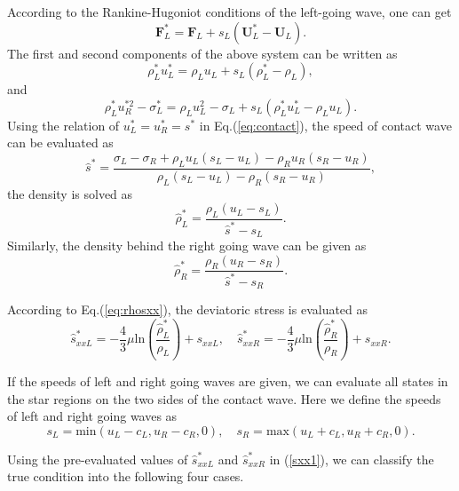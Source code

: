 \documentclass{article}
\numberwithin{equation}{section}
\numberwithin{table}{section}
\begin{document}
According to the Rankine-Hugoniot conditions of  the  left-going  wave, one can get
\begin{equation} \label{eq:RH1}
	\bm{F}_L^* = \bm{F}_L+s_L (\bm{U}_L^*-\bm{U}_L).
\end{equation}
The first and second components of the above system can be written as
\begin{equation} \label{eq:rhoLstar}
  \rho_L^* u_L^*=\rho_L u_L+s_L(\rho_L^*-\rho_L),
\end{equation}
and
\begin{equation}\label{eq:sigma}
  \rho_L^* u_R^{*2}-\sigma^*_L=\rho_L u_L^2-\sigma_L+s_L(\rho_L^* u_L^*-\rho_L u_L).
\end{equation}
Using the relation of $u_L^* =u_R^* = s^*$ in Eq.(\ref{eq:contact}), the speed of contact wave can be evaluated as
\begin{equation}
 \hat{s}^* = \frac{\sigma_L-\sigma_R+\rho_L u_L(s_L-u_L)-\rho_R u_R(s_R-u_R)}{\rho_L(s_L-u_L)-\rho_R(s_R-u_R)},
\end{equation}
the density is solved as
\begin{equation}\label{eq:rhoLs}
  \hat{\rho}_L^* = \frac{\rho_L(u_L-s_L)}{\hat{s}^*-s_L}.
\end{equation}
Similarly, the density behind the right going wave can be given as 
\begin{equation}\label{eq:rhoLs}
  \hat{\rho}_R^* = \frac{\rho_R(u_R-s_R)}{\hat{s}^*-s_R}.
\end{equation}

According  to Eq.(\ref{eq:rhosxx}),  the deviatoric stress is evaluated as
\begin{equation}  \label{sxx1}
  \hat{s}_{xxL}^*=-\frac{4}{3}\mu\text{ln}(\frac{\hat{\rho}_L^*}{\rho_L})+s_{xxL}, \quad   \hat{s}_{xxR}^*=-\frac{4}{3}\mu\text{ln}(\frac{\hat{\rho}_R^*}{\rho_R})+s_{xxR}.
\end{equation}

If the speeds of left and right going waves are given, we can evaluate all states in the star regions on the two sides of  the contact wave. Here we define the speeds of left and right going waves as
	\begin{equation}\label{eq:sLR}
	  s_L = \text{min} (u_L-c_L, u_R-c_R, 0),  \quad s_R = \text{max}(u_L+c_L, u_R+c_R, 0).
	\end{equation}

Using the pre-evaluated values of $\hat{s}_{xxL}^*$ and $\hat{s}_{xxR}^*$ in (\ref{sxx1}), we can classify the true condition into the following four cases.
\end{document}
